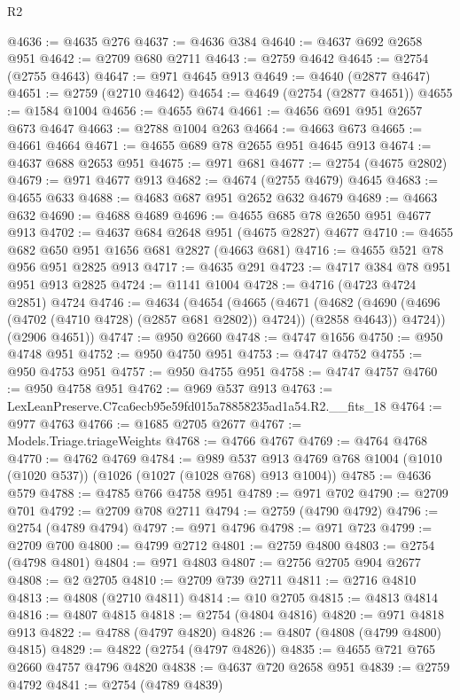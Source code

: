 \begin{lexlean}{R2}
\begin{coremodule}
@4636 := @4635 @276
@4637 := @4636 @384
@4640 := @4637 @692 @2658 @951
@4642 := @2709 @680 @2711
@4643 := @2759 @4642
@4645 := @2754 (@2755 @4643)
@4647 := @971 @4645 @913
@4649 := @4640 (@2877 @4647)
@4651 := @2759 (@2710 @4642)
@4654 := @4649 (@2754 (@2877 @4651))
@4655 := @1584 @1004
@4656 := @4655 @674
@4661 := @4656 @691 @951 @2657 @673 @4647
@4663 := @2788 @1004 @263
@4664 := @4663 @673
@4665 := @4661 @4664
@4671 := @4655 @689 @78 @2655 @951 @4645 @913
@4674 := @4637 @688 @2653 @951
@4675 := @971 @681
@4677 := @2754 (@4675 @2802)
@4679 := @971 @4677 @913
@4682 := @4674 (@2755 @4679) @4645
@4683 := @4655 @633
@4688 := @4683 @687 @951 @2652 @632 @4679
@4689 := @4663 @632
@4690 := @4688 @4689
@4696 := @4655 @685 @78 @2650 @951 @4677 @913
@4702 := @4637 @684 @2648 @951 (@4675 @2827) @4677
@4710 := @4655 @682 @650 @951 @1656 @681 @2827 (@4663 @681)
@4716 := @4655 @521 @78 @956 @951 @2825 @913
@4717 := @4635 @291
@4723 := @4717 @384 @78 @951 @951 @913 @2825
@4724 := @1141 @1004
@4728 := @4716 (@4723 @4724 @2851) @4724
@4746 := @4634
    (@4654
      (@4665
        (@4671
          (@4682 (@4690 (@4696 (@4702 (@4710 @4728) (@2857 @681 @2802)) @4724)) (@2858 @4643))
          @4724))
      (@2906 @4651))
@4747 := @950 @2660
@4748 := @4747 @1656
@4750 := @950 @4748 @951
@4752 := @950 @4750 @951
@4753 := @4747 @4752
@4755 := @950 @4753 @951
@4757 := @950 @4755 @951
@4758 := @4747 @4757
@4760 := @950 @4758 @951
@4762 := @969 @537 @913
@4763 := LexLeanPreserve.C7ca6ecb95e59fd015a78858235ad1a54.R2.__fits_18
@4764 := @977 @4763
@4766 := @1685 @2705 @2677
@4767 := Models.Triage.triageWeights
@4768 := @4766 @4767
@4769 := @4764 @4768
@4770 := @4762 @4769
@4784 := @989
    @537
    @913
    @4769
    @768
    @1004
    (@1010 (@1020 @537))
    (@1026 (@1027 (@1028 @768) @913 @1004))
@4785 := @4636 @579
@4788 := @4785 @766 @4758 @951
@4789 := @971 @702
@4790 := @2709 @701
@4792 := @2709 @708 @2711
@4794 := @2759 (@4790 @4792)
@4796 := @2754 (@4789 @4794)
@4797 := @971 @4796
@4798 := @971 @723
@4799 := @2709 @700
@4800 := @4799 @2712
@4801 := @2759 @4800
@4803 := @2754 (@4798 @4801)
@4804 := @971 @4803
@4807 := @2756 @2705 @904 @2677
@4808 := @2 @2705
@4810 := @2709 @739 @2711
@4811 := @2716 @4810
@4813 := @4808 (@2710 @4811)
@4814 := @10 @2705
@4815 := @4813 @4814
@4816 := @4807 @4815
@4818 := @2754 (@4804 @4816)
@4820 := @971 @4818 @913
@4822 := @4788 (@4797 @4820)
@4826 := @4807 (@4808 (@4799 @4800) @4815)
@4829 := @4822 (@2754 (@4797 @4826))
@4835 := @4655 @721 @765 @2660 @4757 @4796 @4820
@4838 := @4637 @720 @2658 @951
@4839 := @2759 @4792
@4841 := @2754 (@4789 @4839)

\end{coremodule}
\end{lexlean}
